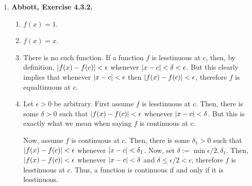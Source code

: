 \documentclass{article}
\DeclarePairedDelimiter\abs{\lvert}{\rvert}
\newcommand{\R}{\mathbf{R}}
\newcommand{\exc}[2][Abbott]{\item \textbf{#1, Exercise #2.}}
\newcommand{\lep}[1][L]{#1et $\epsilon > 0$ be arbitrary}
\begin{document}
\begin{enumerate}
\begin{enumerate}
        \item Assume $c > 0$. Choose $\delta = \min \left( 1, \epsilon ((c-1)^{2/3} + \sqrt[3]{c^2-c} + c^{2/3})\right)$. It is not hard to check that $x^{2/3} + \sqrt[3]{x c} + c^{2/3} > (c-1)^{2/3} + \sqrt[3]{c^2-c} + c^{2/3}$ whenever $\abs{x-c} < 1 \leq \delta$. Then, 
        \begin{align*}
           \abs{\sqrt[3]{x}-\sqrt[3]{c}} &= \abs*{\sqrt[3]{x}-\sqrt[3]{c}} \abs*{\frac{x^{2/3} + \sqrt[3]{x c} + c^{2/3}}{x^{2/3} + \sqrt[3]{x c} + c^{2/3}}} \\
            &= \frac{\abs{x-c}}{x^{2/3} + \sqrt[3]{x c} + c^{2/3}} \\
            &< \frac{\abs{x-c}}{(c-1)^{2/3} + \sqrt[3]{c^2-c} + c^{2/3}} < \epsilon
        \end{align*} whenever $\abs{x-c} < \delta$. Now, assume $c < 0$. Choose $\delta$ such that $\abs{\sqrt[3]{x}-\sqrt[3]{-c}} < \epsilon$ whenever $\abs{x-c} < \delta$. Using the fact that $\sqrt[3]{-y} = -\sqrt[3]{y}$ for any $y \in \R$, we can conclude that $\abs{\sqrt[3]{x}-\sqrt[3]{-c}} = \abs{(-\sqrt[3]{x}) - \sqrt[3]{c}} < \epsilon$. This means that the function $(-1) g(x)$ is continuous at $c$, but Theorem 4.3.4 allows us to conclude that $(-1) (-1) g(x) = g(x)$ must also be continuous at $c$.
    \end{enumerate}
    
    \exc{4.3.2}
    \begin{enumerate}
        \item $f(x) = 1$.
        
        \item $f(x) = x$.
        
        \item There is no such function. If a function $f$ is lesstinuous at $c$, then, by definition, $\abs{f(x)-f(c)} < \epsilon$ whenever $\abs{x-c} < \delta < \epsilon$. But this clearly implies that whenever $\abs{x-c} < \epsilon$ then $\abs{f(x)-f(c)} < \epsilon$, therefore $f$ is equaltinuous at $c$.
        
        \item \lep. First assume $f$ is lesstinuous at $c$. Then, there is some $\delta > 0$ such that $\abs{f(x)-f(c)} < \epsilon$ whenever $\abs{x-c} < \delta$. But this is exactly what we mean when saying $f$ is continuous at $c$.
        
        Now, assume $f$ is continuous at $c$. Then, there is some $\delta_1 > 0$ such that $\abs{f(x)-f(c)} < \epsilon$ whenever $\abs{x-c} < \delta_1$. Now, set $\delta := \min{\epsilon/2, \delta_1}$. Then, $\abs{f(x)-f(c)} < \epsilon$ whenever $\abs{x-c} < \delta$ and $\delta \leq \epsilon/2 < \epsilon$, therefore $f$ is lesstinuous at $c$.
        Thus, a function is continuous if and only if it is lesstinuous.
        

\end{enumerate}
\end{enumerate}
\end{document}
